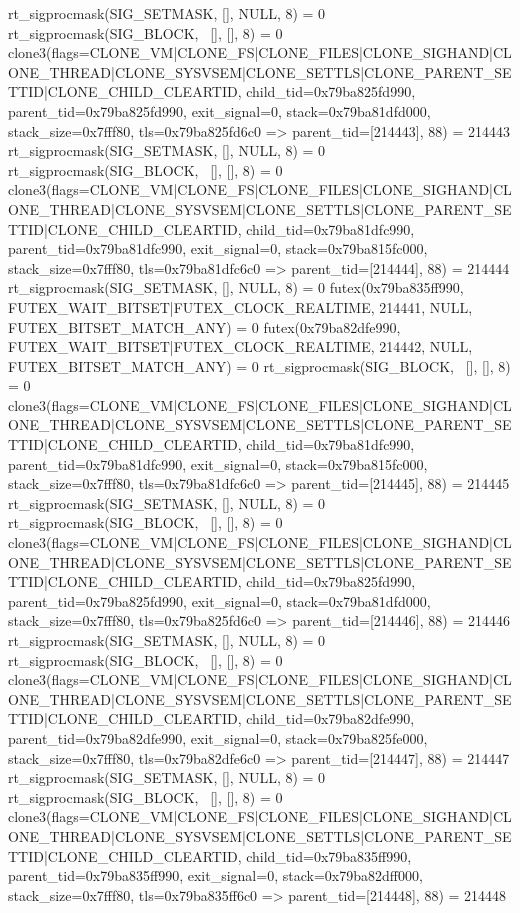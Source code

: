 \begin{breakableverbatim}
rt_sigprocmask(SIG_SETMASK, [], NULL, 8) = 0
rt_sigprocmask(SIG_BLOCK, ~[], [], 8)   = 0
clone3({flags=CLONE_VM|CLONE_FS|CLONE_FILES|CLONE_SIGHAND|CLONE_THREAD|CLONE_SYSVSEM|CLONE_SETTLS|CLONE_PARENT_SETTID|CLONE_CHILD_CLEARTID, child_tid=0x79ba825fd990, parent_tid=0x79ba825fd990, exit_signal=0, stack=0x79ba81dfd000, stack_size=0x7fff80, tls=0x79ba825fd6c0} => {parent_tid=[214443]}, 88) = 214443
rt_sigprocmask(SIG_SETMASK, [], NULL, 8) = 0
rt_sigprocmask(SIG_BLOCK, ~[], [], 8)   = 0
clone3({flags=CLONE_VM|CLONE_FS|CLONE_FILES|CLONE_SIGHAND|CLONE_THREAD|CLONE_SYSVSEM|CLONE_SETTLS|CLONE_PARENT_SETTID|CLONE_CHILD_CLEARTID, child_tid=0x79ba81dfc990, parent_tid=0x79ba81dfc990, exit_signal=0, stack=0x79ba815fc000, stack_size=0x7fff80, tls=0x79ba81dfc6c0} => {parent_tid=[214444]}, 88) = 214444
rt_sigprocmask(SIG_SETMASK, [], NULL, 8) = 0
futex(0x79ba835ff990, FUTEX_WAIT_BITSET|FUTEX_CLOCK_REALTIME, 214441, NULL, FUTEX_BITSET_MATCH_ANY) = 0
futex(0x79ba82dfe990, FUTEX_WAIT_BITSET|FUTEX_CLOCK_REALTIME, 214442, NULL, FUTEX_BITSET_MATCH_ANY) = 0
rt_sigprocmask(SIG_BLOCK, ~[], [], 8)   = 0
clone3({flags=CLONE_VM|CLONE_FS|CLONE_FILES|CLONE_SIGHAND|CLONE_THREAD|CLONE_SYSVSEM|CLONE_SETTLS|CLONE_PARENT_SETTID|CLONE_CHILD_CLEARTID, child_tid=0x79ba81dfc990, parent_tid=0x79ba81dfc990, exit_signal=0, stack=0x79ba815fc000, stack_size=0x7fff80, tls=0x79ba81dfc6c0} => {parent_tid=[214445]}, 88) = 214445
rt_sigprocmask(SIG_SETMASK, [], NULL, 8) = 0
rt_sigprocmask(SIG_BLOCK, ~[], [], 8)   = 0
clone3({flags=CLONE_VM|CLONE_FS|CLONE_FILES|CLONE_SIGHAND|CLONE_THREAD|CLONE_SYSVSEM|CLONE_SETTLS|CLONE_PARENT_SETTID|CLONE_CHILD_CLEARTID, child_tid=0x79ba825fd990, parent_tid=0x79ba825fd990, exit_signal=0, stack=0x79ba81dfd000, stack_size=0x7fff80, tls=0x79ba825fd6c0} => {parent_tid=[214446]}, 88) = 214446
rt_sigprocmask(SIG_SETMASK, [], NULL, 8) = 0
rt_sigprocmask(SIG_BLOCK, ~[], [], 8)   = 0
clone3({flags=CLONE_VM|CLONE_FS|CLONE_FILES|CLONE_SIGHAND|CLONE_THREAD|CLONE_SYSVSEM|CLONE_SETTLS|CLONE_PARENT_SETTID|CLONE_CHILD_CLEARTID, child_tid=0x79ba82dfe990, parent_tid=0x79ba82dfe990, exit_signal=0, stack=0x79ba825fe000, stack_size=0x7fff80, tls=0x79ba82dfe6c0} => {parent_tid=[214447]}, 88) = 214447
rt_sigprocmask(SIG_SETMASK, [], NULL, 8) = 0
rt_sigprocmask(SIG_BLOCK, ~[], [], 8)   = 0
clone3({flags=CLONE_VM|CLONE_FS|CLONE_FILES|CLONE_SIGHAND|CLONE_THREAD|CLONE_SYSVSEM|CLONE_SETTLS|CLONE_PARENT_SETTID|CLONE_CHILD_CLEARTID, child_tid=0x79ba835ff990, parent_tid=0x79ba835ff990, exit_signal=0, stack=0x79ba82dff000, stack_size=0x7fff80, tls=0x79ba835ff6c0} => {parent_tid=[214448]}, 88) = 214448

\end{breakableverbatim}
